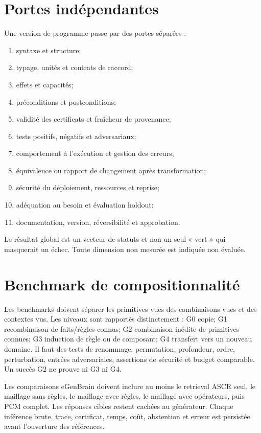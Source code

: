 \documentclass[11pt,a4paper,openany]{book}
\theoremstyle{definition}
\theoremstyle{plain}
\theoremstyle{remark}
\begin{document}
\section{Portes indépendantes}
Une version de programme passe par des portes séparées :
\begin{enumerate}
\item syntaxe et structure;
\item typage, unités et contrats de raccord;
\item effets et capacités;
\item préconditions et postconditions;
\item validité des certificats et fraîcheur de provenance;
\item tests positifs, négatifs et adversariaux;
\item comportement à l'exécution et gestion des erreurs;
\item équivalence ou rapport de changement après transformation;
\item sécurité du déploiement, ressources et reprise;
\item adéquation au besoin et évaluation holdout;
\item documentation, version, réversibilité et approbation.
\end{enumerate}
Le résultat global est un vecteur de statuts et non un seul « vert » qui masquerait un échec. Toute dimension non mesurée est indiquée non évaluée.

\section{Benchmark de compositionnalité}
Les benchmarks doivent séparer les primitives vues des combinaisons vues et des contextes vus. Les niveaux sont rapportés distinctement : G0 copie; G1 recombinaison de faits/règles connus; G2 combinaison inédite de primitives connues; G3 induction de règle ou de composant; G4 transfert vers un nouveau domaine. Il faut des tests de renommage, permutation, profondeur, ordre, perturbation, entrées adversariales, assertions de sécurité et budget comparable. Un succès G2 ne prouve ni G3 ni G4.

Les comparaisons eGenBrain doivent inclure au moins le retrieval ASCR seul, le maillage sans règles, le maillage avec règles, le maillage avec opérateurs, puis PCM complet. Les réponses cibles restent cachées au générateur. Chaque inférence brute, trace, certificat, temps, coût, abstention et erreur est persistée avant l'ouverture des références.
\end{document}
